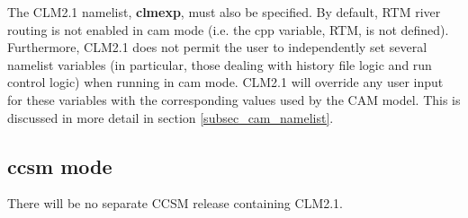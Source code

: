 The CLM2.1 namelist, {\bf clmexp}, must also be specified.  By
default, RTM river routing is not enabled in cam mode (i.e. the cpp
variable, RTM, is not defined). Furthermore, CLM2.1 does not permit
the user to independently set several namelist variables (in
particular, those dealing with history file logic and run control
logic) when running in cam mode. CLM2.1 will override any user input
for these variables with the corresponding values used by the CAM
model. This is discussed in more detail in section
\ref{subsec_cam_namelist}.

\subsection {ccsm mode}

There will be no separate CCSM release containing CLM2.1. 

